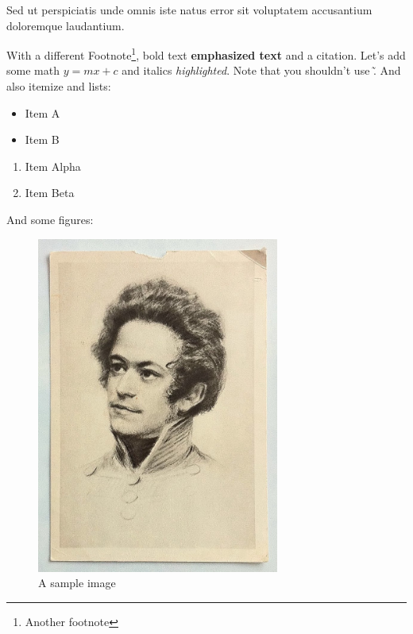 \def \textwidth {15.92cm}
\def \halftextwidth {7.96cm}

Sed ut perspiciatis unde omnis iste natus error sit voluptatem accusantium doloremque laudantium.

With a different Footnote\footnote{Another footnote}, bold text \textbf{emphasized text} and a citation\cite{einstein2013principle}. Let's add some math $y = mx + c$ and italics \textit{highlighted}. Note that you shouldn't use \~. And also itemize and lists:
\begin{itemize}
	\item Item A
	\item Item B
\end{itemize}
\begin{enumerate}
	\item Item Alpha
	\item Item Beta
\end{enumerate}
And some figures:
\begin{center}
	\begin{figure}[H]
		\includegraphics[width=\halftextwidth]{../resources/sample-image.png}
		\caption{A sample image}
		\label{fig:sample}
	\end{figure}
\end{center}

